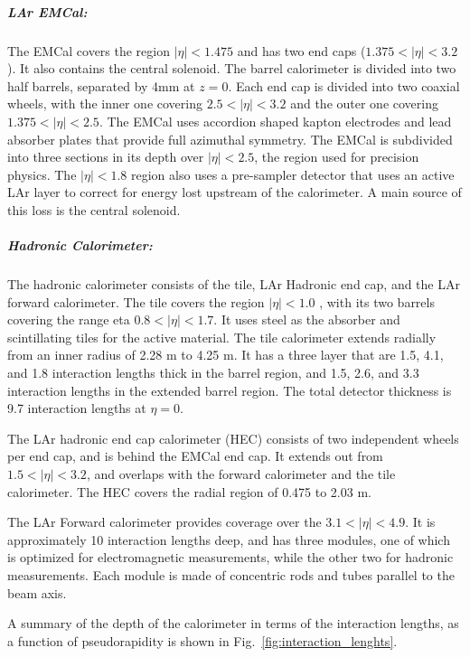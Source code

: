 \subparagraph{LAr EMCal: }
The EMCal covers the region $|\eta| < 1.475$ and has two end caps ($1.375 < |\eta| < 3.2$). It also contains the central solenoid. The barrel calorimeter is divided into two half barrels, separated by 4mm at $z = 0$. Each end cap is divided into two coaxial wheels, with the inner one covering $2.5 < |\eta| < 3.2$ and the outer one covering  $1.375 < |\eta| < 2.5$. The EMCal uses accordion shaped kapton electrodes and lead absorber plates that provide full azimuthal symmetry. The EMCal is subdivided into three sections in its depth over $|\eta| < 2.5$, the region used for precision physics. The $|\eta| < 1.8$ region also uses a pre-sampler detector that uses an active LAr layer to correct for energy lost upstream of the calorimeter. A main source of this loss is the central solenoid.

\subparagraph{Hadronic Calorimeter: }
The hadronic calorimeter consists of the tile, LAr Hadronic end cap, and the LAr forward calorimeter. The tile covers the region $|\eta| < 1.0$ , with its two barrels covering the range eta $0.8 < |\eta| < 1.7$. It uses steel as the absorber and scintillating tiles for the active material. The tile calorimeter extends radially from an inner radius of 2.28 m to 4.25 m. It has a three layer that are 1.5, 4.1, and 1.8 interaction lengths thick in the barrel region, and 1.5, 2.6, and 3.3 interaction lengths in the extended barrel region. The total detector thickness is 9.7 interaction lengths at $\eta = 0$. 

The LAr hadronic end cap calorimeter (HEC) consists of two independent wheels per end cap, and is behind the EMCal end cap. It extends out from $1.5 < |\eta| < 3.2$, and overlaps with the forward calorimeter and the tile calorimeter. The HEC covers the radial region of 0.475 to 2.03 m. 

The LAr Forward calorimeter provides coverage over the $3.1 < |\eta| < 4.9$. It is approximately 10 interaction lengths deep, and has three modules, one of which is optimized for electromagnetic measurements, while the other two for hadronic measurements. Each module is made of concentric rods and tubes parallel to the beam axis. 


A summary of the depth of the calorimeter in terms of the interaction lengths, as a function of pseudorapidity is shown in Fig.~\ref{fig:interaction_lenghts}.


